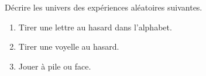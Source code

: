 
\begin{exercice}\label{exosmath-0197}

    Décrire les univers des expériences aléatoires suivantes.
    \begin{enumerate}
        \item
            Tirer une lettre au hasard dans l'alphabet.
        \item
            Tirer une voyelle au hasard.
        \item
            Jouer à pile ou face.
    \end{enumerate}

\end{exercice}
